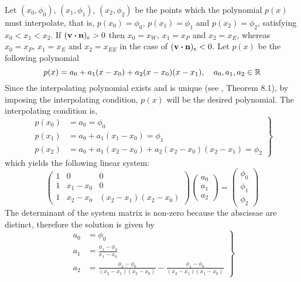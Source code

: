 \noindent
Let $(x_0, \phi_0)$, $(x_1, \phi_1)$, $(x_2, \phi_2)$ be the points which the
polynomial $p(x)$ must interpolate, that is, $p(x_0) = \phi_0$, $p(x_1) =
\phi_1$ and $p(x_2) = \phi_2$, satisfying $x_0 < x_1 < x_2$. If $(\vb{v} \vdot
\vb{n})_e > 0$ then $x_0 = x_W$, $x_1 = x_P$ and $x_2 = x_E$, whereas $x_0 =
x_P$, $x_1 = x_E$ and $x_2 = x_{EE}$ in the case of $(\vb{v} \vdot \vb{n})_e <
0$. Let $p(x)$ be the following polynomial
\begin{equation*}
	p(x) = a_0 + a_1 (x - x_0) + a_2 (x - x_0) (x - x_1), \quad a_0, a_1, a_2 \in \mathbb{R}
\end{equation*}
Since the interpolating polynomial exists and is unique (see
\cite{quarteroni2010numerical8pinterp}, Theorem 8.1), by imposing the
interpolating condition, $p(x)$ will be the desired polynomial. The
interpolating condition is,
\begin{equation*}
	\left.
	\begin{aligned}
		p(x_0) &= a_0 = \phi_0 \\
		p(x_1) &= a_0 + a_1 (x_1 - x_0) = \phi_1 \\
		p(x_2) &= a_0 + a_1 (x_2 - x_0) + a_2 (x_2 - x_0) (x_2 - x_1) = \phi_2
	\end{aligned}	
	\right\}
\end{equation*}
which yields the following linear system:
\begin{equation*}
	\begin{pmatrix}
		1 & 0 & 0 \\
		1 & x_1 - x_0 & 0 \\
		1 & x_2 - x_0 & (x_2 - x_1)(x_2 - x_0)
	\end{pmatrix}
	\begin{pmatrix}
		a_0 \\ a_1 \\ a_2
	\end{pmatrix} = 
	\begin{pmatrix}
		\phi_0 \\ \phi_1 \\ \phi_2
	\end{pmatrix}
\end{equation*}
The determinant of the system matrix is non-zero because the abscissae are
distinct, therefore the solution is given by
\begin{equation*}
	\left.
	\begin{aligned}
		a_0 &= \phi_0 \\
		a_1 &= \frac{\phi_1 - \phi_0}{x_1 - x_0} \\
		a_2 &= \frac{\phi_2 - \phi_0}{(x_2 - x_1)(x_2 - x_0)} - \frac{\phi_1 - \phi_0}{(x_2 - x_1)(x_1 - x_0)}
	\end{aligned}	
	\right\}
\end{equation*}
